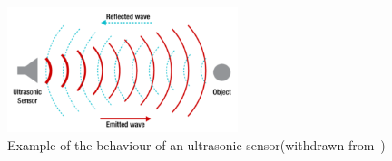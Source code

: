\begin{figure}[!hbt]
\centering
    \includegraphics[width=0.6\textwidth]{./img/ultrasonic-sensor.png}
  \caption{Example of the behaviour of an ultrasonic sensor(withdrawn from~\cite{ultrasonic-sensor-img})}%
\label{fig:ultrasonic-sensor}
\end{figure}

